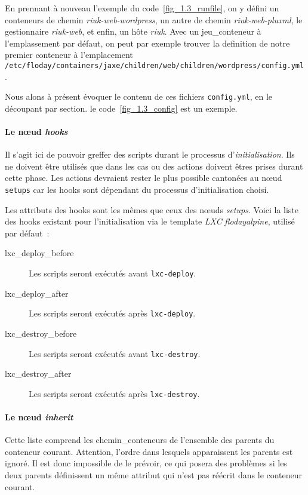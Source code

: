 En prennant à nouveau l'exemple du code~\ref{fig_1.3_runfile}, on y défini un conteneurs de chemin \emph{riuk-web-wordpress}, un autre de chemin \emph{riuk-web-pluxml}, le gestionnaire \emph{riuk-web}, et enfin, un hôte \emph{riuk}.
Avec un \gls{jeu_conteneur} à l'emplassement par défaut, on peut par exemple trouver la \gls{definition} de notre premier conteneur à l'emplacement {\tt/etc/floday/containers/jaxe/children/web/children/wordpress/config.yml}.



Nous alons à présent évoquer le contenu de ces fichiers {\tt{}config.yml}, en le découpant par section. le code~\ref{fig_1.3_config} est un exemple.

\paragraph{Le nœud \emph{hooks}}
Il s'agit ici de pouvoir greffer des scripts durant le processus d'\emph{initialisation}.
Ils ne doivent être utilisés que dans les cas ou des actions doivent êtres prises durant cette phase.
Les actions devraient rester le plus possible cantonées au nœud {\tt setups} car les hooks sont dépendant du processus d'initialisation choisi.

Les attributs des hooks sont les mêmes que ceux des nœuds \emph{setups}.
Voici la liste des hooks existant pour l'initialisation via le template \emph{LXC} \emph{flodayalpine}, utilisé par défaut~:

\begin{description}
	\item[lxc\_deploy\_before] Les scripts seront exécutés avant {\tt lxc-deploy}.
	\item[lxc\_deploy\_after] Les scripts seront exécutés après {\tt lxc-deploy}.
	\item[lxc\_destroy\_before] Les scripts seront exécutés avant {\tt lxc-destroy}.
	\item[lxc\_destroy\_after] Les scripts seront exécutés après {\tt lxc-destroy}.
\end{description}

\paragraph{Le nœud \emph{inherit}}
Cette liste comprend les \glspl{chemin_conteneur} de l'ensemble des parents du conteneur courant.
Attention, l'ordre dans lesquels apparaissent les parents est ignoré.
Il est donc impossible de le prévoir, ce qui posera des problèmes si les deux parents définissent un même \gls{attribut}  qui n'est pas réécrit dans le conteneur courant.

